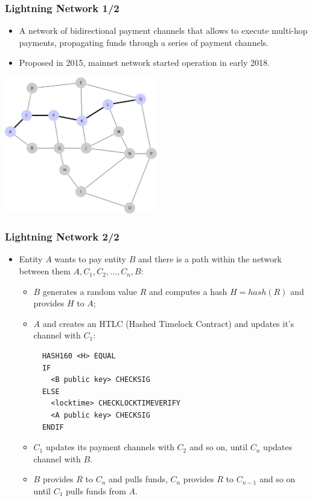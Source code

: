\documentclass{beamer}
\begin{document}
\begin{frame}[fragile]
  \frametitle{Lightning Network 1/2}
  \begin{itemize}
  \item A network of bidirectional payment channels that allows to execute
    multi-hop payments, propagating funds through a series of payment channels.
  \item Proposed in 2015, mainnet network started operation in early 2018.
  \end{itemize}
  \begin{center}
    \includegraphics[width=0.5\textwidth]{ln}
  \end{center}
\end{frame}

\begin{frame}[fragile]
  \frametitle{Lightning Network 2/2}
  \begin{itemize}
  \item Entity $A$ wants to pay entity $B$ and there is a path within the network
    between them $A, C_1, C_2, ..., C_n, B$:
    \begin{itemize}
    \item $B$ generates a random value $R$ and computes a hash $H = hash(R)$ and
      provides $H$ to $A$;
    \item $A$ and creates an HTLC (Hashed Timelock Contract) and updates it's
      channel with $C_1$:
      \begin{verbatim}
  HASH160 <H> EQUAL
  IF
    <B public key> CHECKSIG
  ELSE
    <locktime> CHECKLOCKTIMEVERIFY
    <A public key> CHECKSIG
  ENDIF
      \end{verbatim}
    \item $C_1$ updates its payment channels with $C_2$ and so on, until $C_n$
      updates channel with $B$.
    \item $B$ provides $R$ to $C_n$ and pulls funds, $C_n$ provides $R$ to
      $C_{n-1}$ and so on until $C_1$ pulls funds from $A$.
    \end{itemize}
  \end{itemize}
\end{frame}
\end{document}
